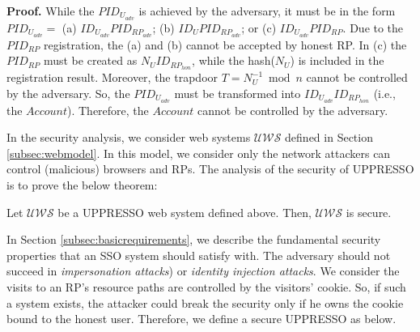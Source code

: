 \noindent\textbf{Proof. }
While the $PID_{U_{adv}}$ is achieved by the adversary, it must be in the form $PID_{U_{adv}}=$ (a) $ID_{U_{adv}}PID_{RP_{adv}}$; (b) $ID_{U}PID_{RP_{adv}}$; or (c) $ID_{U_{adv}}PID_{RP}$. Due to the $PID_{RP}$ registration, the (a) and (b) cannot be accepted by honest RP. In (c) the $PID_{RP}$ must be created as $N_UID_{RP_{hon}}$, while the hash($N_U$) is included in the registration result. Moreover, the trapdoor $T=N_U^{-1} \bmod n$ cannot be controlled by the adversary. So, the $PID_{U_{adv}}$ must be transformed into $ID_{U_{adv}}ID_{RP_{hon}}$ (i.e., the $Account$). Therefore, the $Account$ cannot be controlled by the adversary.

In the security analysis, we consider web systems $\mathcal{UWS}$ defined in Section \ref{subsec:webmodel}.
In this model, we consider only
the network attackers can control (malicious) browsers and RPs.
The analysis of the security of UPPRESSO is to prove the below theorem:
\vspace{-\topsep}
\begin{theorem}
Let $\mathcal{UWS}$ be a UPPRESSO web system defined above. Then, $\mathcal{UWS}$ is secure.
\label{the:secure}
\end{theorem}
\vspace{-\topsep}
In Section \ref{subsec:basicrequirements}, we describe the fundamental security properties that an SSO system should satisfy with.  The adversary should not succeed in \emph{impersonation attacks}) or \emph{identity injection attacks}.
We consider the visits to an RP's resource paths are controlled by the visitors' cookie. So, if such a system exists, the attacker could break the security only if he owns the cookie bound to the honest user.
Therefore, we define a secure UPPRESSO as below.

